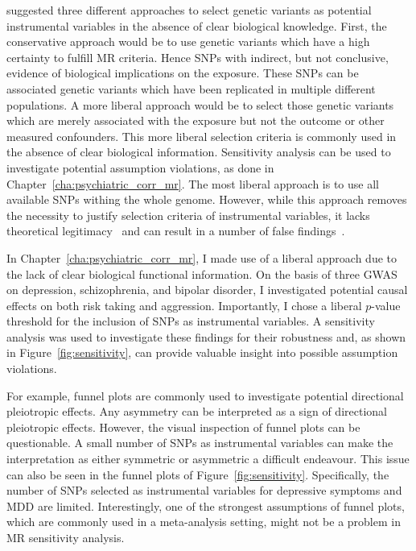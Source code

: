 \citet{Burgess2016a} suggested three different approaches to select genetic variants as potential instrumental  variables in the absence of clear biological knowledge.
First, the conservative approach would be to use genetic variants which have a high certainty to fulfill MR criteria.
Hence SNPs with indirect, but not conclusive, evidence of biological implications on the exposure.
These SNPs can be associated genetic variants which have been replicated in multiple different populations.
A more liberal approach would be to select those genetic variants which are merely associated with the exposure but not the outcome or other measured confounders.
This more liberal selection criteria is commonly used in the absence of clear biological information.
Sensitivity analysis can be used to investigate potential assumption violations, as done in Chapter~\ref{cha:psychiatric_corr_mr}.
The most liberal approach is to use all available SNPs withing the whole genome.
However, while this approach removes the necessity to justify  selection criteria of instrumental variables, it lacks theoretical legitimacy~\cite{Burgess2016a} and can result in a number of false findings~\cite{Evans2013}.

In Chapter~\ref{cha:psychiatric_corr_mr}, I made use of a liberal approach due to the lack of clear biological functional information.
On the basis of three GWAS on depression, schizophrenia, and bipolar disorder, I investigated potential causal effects on both risk taking and aggression.
Importantly, I chose a liberal $p$-value threshold for the inclusion of SNPs as instrumental variables.
A sensitivity analysis was used to investigate these findings for their robustness and, as shown in Figure~\ref{fig:sensitivity}, can provide valuable insight into possible assumption violations.

For example, funnel plots are commonly used to investigate potential directional pleiotropic effects.
Any asymmetry can be interpreted as a sign of directional pleiotropic effects.
However, the visual inspection of funnel plots can be questionable.
A small number of  SNPs as instrumental variables can make the interpretation as either symmetric or asymmetric a difficult endeavour. 
This issue can also be seen in the funnel plots of Figure~\ref{fig:sensitivity}.
Specifically, the number of SNPs selected as instrumental variables for depressive symptoms and MDD are limited. 
Interestingly, one of the strongest assumptions of funnel plots, which are commonly used in a meta-analysis setting, might not be a problem in MR sensitivity analysis.


